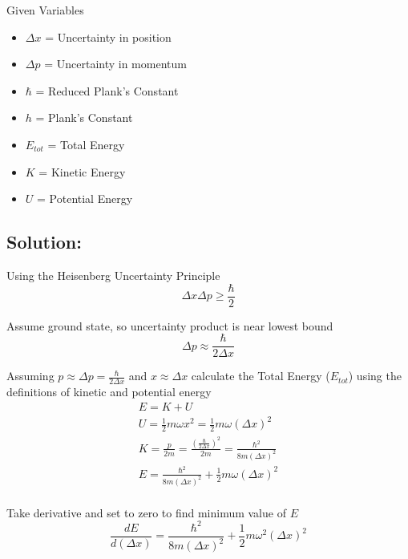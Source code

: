 \documentclass[12pt]{article}
\begin{document}
    Given Variables
    \begin{itemize}
        \item $\Delta x$ = Uncertainty in position
        \item $\Delta p$ = Uncertainty in momentum
        \item $\hbar$ = Reduced Plank's Constant
        \item $h$ = Plank's Constant
        \item $E_{tot}$ = Total Energy
        \item $K$ = Kinetic Energy
        \item $U$ = Potential Energy
        
    \end{itemize}
    \subsection*{Solution:}

        Using the Heisenberg Uncertainty Principle
        \begin{equation}
            \Delta x \Delta p \geq \frac{\hbar}{2}
        \end{equation}

        Assume ground state, so uncertainty product is near lowest bound
        \begin{equation}
            \Delta p \approx \frac{\hbar}{2 \Delta x}
        \end{equation}

        Assuming $p \approx \Delta p = \frac{\hbar}{2 \Delta x}$ and $x \approx \Delta x$ calculate the Total Energy ($E_{tot}$) using the definitions of kinetic and potential energy
        \begin{equation} \label{eq: E}
            \begin{split}
                E = K + U \\
                U = \frac{1}{2} m \omega x^2 = \frac{1}{2} m \omega (\Delta x)^2 \\
                K = \frac{p}{2m} = \frac{(\frac{\hbar}{2 \Delta x})^2}{2m} = \frac{\hbar^2}{8 m (\Delta x)^2} \\
                E = \frac{\hbar^2}{8 m (\Delta x)^2} + \frac{1}{2} m \omega (\Delta x)^2 \\
            \end{split}
        \end{equation}

        Take derivative and set to zero to find minimum value of $E$
        \begin{equation}
            \frac{d E}{d (\Delta x)} = \frac{\hbar^2}{8 m (\Delta x)^2} + \frac{1}{2} m \omega^2 (\Delta x)^2
        \end{equation}
\end{document}
